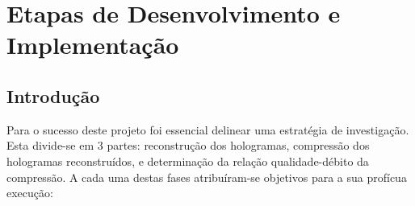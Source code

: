 
\chapter{Etapas de Desenvolvimento e Implementação}
\label{ch::imp-test}

\section{Introdução}
\label{sec::imp-test:intro}

Para o sucesso deste projeto foi essencial delinear uma estratégia de investigação. Esta divide-se em 3 partes: reconstrução dos hologramas, compressão dos hologramas reconstruídos, e determinação da relação qualidade-débito da compressão. A cada uma destas fases atribuíram-se objetivos para a sua profícua execução:

